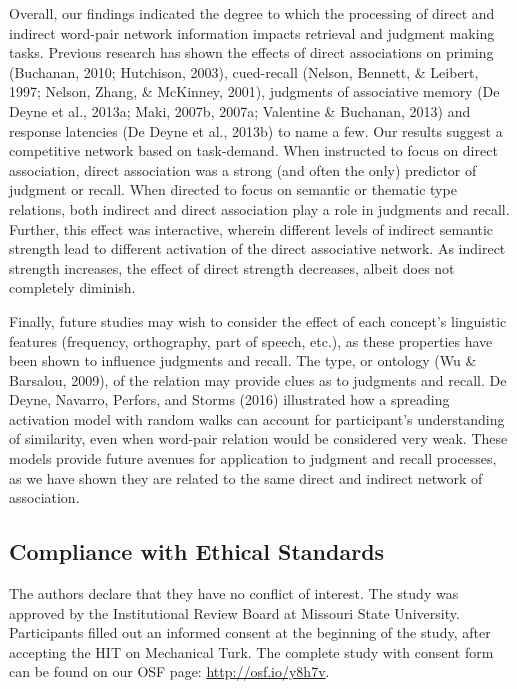 \documentclass[english,,man]{apa6}
\begin{document}
Overall, our findings indicated the degree to which the processing of direct and indirect word-pair network information impacts retrieval and judgment making tasks. Previous research has shown the effects of direct associations on priming (Buchanan, 2010; Hutchison, 2003), cued-recall (Nelson, Bennett, \& Leibert, 1997; Nelson, Zhang, \& McKinney, 2001), judgments of associative memory (De Deyne et al., 2013a; Maki, 2007b, 2007a; Valentine \& Buchanan, 2013) and response latencies (De Deyne et al., 2013b) to name a few. Our results suggest a competitive network based on task-demand. When instructed to focus on direct association, direct association was a strong (and often the only) predictor of judgment or recall. When directed to focus on semantic or thematic type relations, both indirect and direct association play a role in judgments and recall. Further, this effect was interactive, wherein different levels of indirect semantic strength lead to different activation of the direct associative network. As indirect strength increases, the effect of direct strength decreases, albeit does not completely diminish.

Finally, future studies may wish to consider the effect of each concept's linguistic features (frequency, orthography, part of speech, etc.), as these properties have been shown to influence judgments and recall. The type, or ontology (Wu \& Barsalou, 2009), of the relation may provide clues as to judgments and recall. De Deyne, Navarro, Perfors, and Storms (2016) illustrated how a spreading activation model with random walks can account for participant's understanding of similarity, even when word-pair relation would be considered very weak. These models provide future avenues for application to judgment and recall processes, as we have shown they are related to the same direct and indirect network of association.

\hypertarget{compliance-with-ethical-standards}{%
\subsection{Compliance with Ethical Standards}\label{compliance-with-ethical-standards}}

The authors declare that they have no conflict of interest. The study was approved by the Institutional Review Board at Missouri State University. Participants filled out an informed consent at the beginning of the study, after accepting the HIT on Mechanical Turk. The complete study with consent form can be found on our OSF page: \url{http://osf.io/y8h7v}.
\end{document}
